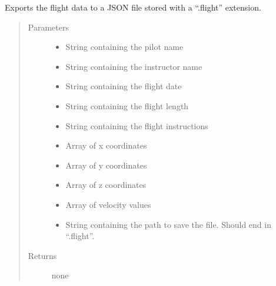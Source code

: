 \documentclass[letterpaper,10pt,english]{sphinxmanual}
\begin{document}
\begin{fulllineitems}
\label{\detokenize{index:src.Export.ExportFile.export_data}}
Exports the flight data to a JSON file stored with a “.flight” extension.
\begin{quote}\begin{description}
\item[{Parameters}] \leavevmode\begin{itemize}
\item {} 
 \textendash{} String containing the pilot name

\item {} 
 \textendash{} String containing the instructor name

\item {} 
 \textendash{} String containing the flight date

\item {} 
 \textendash{} String containing the flight length

\item {} 
 \textendash{} String containing the flight instructions

\item {} 
 \textendash{} Array of x coordinates

\item {} 
 \textendash{} Array of y coordinates

\item {} 
 \textendash{} Array of z coordinates

\item {} 
 \textendash{} Array of velocity values

\item {} 
 \textendash{} String containing the path to save the file. Should end in “.flight”.

\end{itemize}

\item[{Returns}] \leavevmode
none

\end{description}\end{quote}

\end{fulllineitems}
\end{document}
